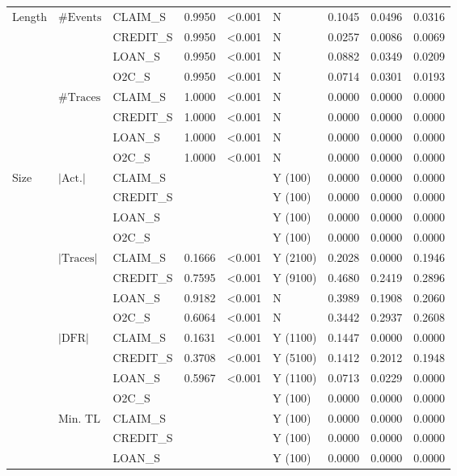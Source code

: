 \begin{longtable}{lllcclccc}
\bottomrule
\endfoot
Length & $\#\text{Events}$ & CLAIM\_S & 0.9950 & <0.001 & N & 0.1045 & 0.0496 & 0.0316 \\
 &  & CREDIT\_S & 0.9950 & <0.001 & N & 0.0257 & 0.0086 & 0.0069 \\
 &  & LOAN\_S & 0.9950 & <0.001 & N & 0.0882 & 0.0349 & 0.0209 \\
 &  & O2C\_S & 0.9950 & <0.001 & N & 0.0714 & 0.0301 & 0.0193 \\
\cmidrule(lr){2-9}
 & $\#\text{Traces}$ & CLAIM\_S & 1.0000 & <0.001 & N & 0.0000 & 0.0000 & 0.0000 \\
 &  & CREDIT\_S & 1.0000 & <0.001 & N & 0.0000 & 0.0000 & 0.0000 \\
 &  & LOAN\_S & 1.0000 & <0.001 & N & 0.0000 & 0.0000 & 0.0000 \\
 &  & O2C\_S & 1.0000 & <0.001 & N & 0.0000 & 0.0000 & 0.0000 \\
\cmidrule(lr){1-9}
Size & $|\text{Act.}|$ & CLAIM\_S &  &  & Y (100) & 0.0000 & 0.0000 & 0.0000 \\
 &  & CREDIT\_S &  &  & Y (100) & 0.0000 & 0.0000 & 0.0000 \\
 &  & LOAN\_S &  &  & Y (100) & 0.0000 & 0.0000 & 0.0000 \\
 &  & O2C\_S &  &  & Y (100) & 0.0000 & 0.0000 & 0.0000 \\
\cmidrule(lr){2-9}
 & $|\text{Traces}|$ & CLAIM\_S & 0.1666 & <0.001 & Y (2100) & 0.2028 & 0.0000 & 0.1946 \\
 &  & CREDIT\_S & 0.7595 & <0.001 & Y (9100) & 0.4680 & 0.2419 & 0.2896 \\
 &  & LOAN\_S & 0.9182 & <0.001 & N & 0.3989 & 0.1908 & 0.2060 \\
 &  & O2C\_S & 0.6064 & <0.001 & N & 0.3442 & 0.2937 & 0.2608 \\
\cmidrule(lr){2-9}
 & $|\text{DFR}|$ & CLAIM\_S & 0.1631 & <0.001 & Y (1100) & 0.1447 & 0.0000 & 0.0000 \\
 &  & CREDIT\_S & 0.3708 & <0.001 & Y (5100) & 0.1412 & 0.2012 & 0.1948 \\
 &  & LOAN\_S & 0.5967 & <0.001 & Y (1100) & 0.0713 & 0.0229 & 0.0000 \\
 &  & O2C\_S &  &  & Y (100) & 0.0000 & 0.0000 & 0.0000 \\
\cmidrule(lr){2-9}
 & $\text{Min. TL}$ & CLAIM\_S &  &  & Y (100) & 0.0000 & 0.0000 & 0.0000 \\
 &  & CREDIT\_S &  &  & Y (100) & 0.0000 & 0.0000 & 0.0000 \\
 &  & LOAN\_S &  &  & Y (100) & 0.0000 & 0.0000 & 0.0000 \\

\end{longtable}
